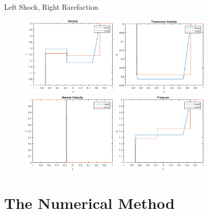 \documentclass{beamer}
\begin{document}
\begin{frame}{Left Shock, Right Rarefaction}
\begin{figure}[ht]
\centering
\includegraphics[width=1.8in]{lShockDen}
\includegraphics[width=1.8in]{lShockU}\\
\includegraphics[width=1.8in]{lShockV}
\includegraphics[width=1.8in]{lShockP}
\end{figure}
\end{frame}

\section{The Numerical Method}
\end{document}
